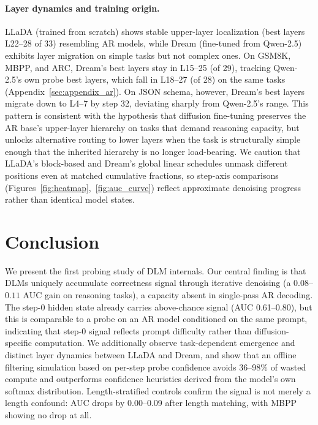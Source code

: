 \documentclass[11pt]{article}
\begin{document}
\paragraph{Layer dynamics and training origin.}\label{sec:layer_dynamics_discussion}
LLaDA (trained from scratch) shows stable upper-layer localization (best layers L22--28 of 33) resembling AR models, while Dream (fine-tuned from Qwen-2.5) exhibits layer migration on simple tasks but not complex ones.
On GSM8K, MBPP, and ARC, Dream's best layers stay in L15--25 (of 29), tracking Qwen-2.5's own probe best layers, which fall in L18--27 (of 28) on the same tasks (Appendix~\ref{sec:appendix_ar}).
On JSON schema, however, Dream's best layers migrate down to L4--7 by step 32, deviating sharply from Qwen-2.5's range.
This pattern is consistent with the hypothesis that diffusion fine-tuning preserves the AR base's upper-layer hierarchy on tasks that demand reasoning capacity, but unlocks alternative routing to lower layers when the task is structurally simple enough that the inherited hierarchy is no longer load-bearing.
We caution that LLaDA's block-based and Dream's global linear schedules unmask different positions even at matched cumulative fractions, so step-axis comparisons (Figures~\ref{fig:heatmap},~\ref{fig:auc_curve}) reflect approximate denoising progress rather than identical model states.

\section{Conclusion}

We present the first probing study of DLM internals.
Our central finding is that DLMs uniquely accumulate correctness signal through iterative denoising (a $0.08$--$0.11$ AUC gain on reasoning tasks), a capacity absent in single-pass AR decoding.
The step-0 hidden state already carries above-chance signal (AUC 0.61--0.80), but this is comparable to a probe on an AR model conditioned on the same prompt, indicating that step-0 signal reflects prompt difficulty rather than diffusion-specific computation.
We additionally observe task-dependent emergence and distinct layer dynamics between LLaDA and Dream, and show that an offline filtering simulation based on per-step probe confidence avoids 36--98\% of wasted compute and outperforms confidence heuristics derived from the model's own softmax distribution.
Length-stratified controls confirm the signal is not merely a length confound: AUC drops by 0.00--0.09 after length matching, with MBPP showing no drop at all.
\end{document}
